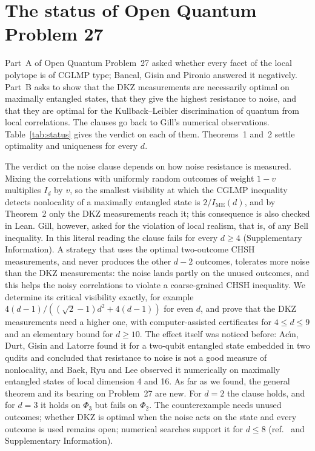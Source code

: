 \documentclass[11pt]{article}
\newcommand{\IME}{I_{\mathrm{ME}}}
\begin{document}
\section*{The status of Open Quantum Problem 27}

Part~A of Open Quantum Problem~27 asked whether every facet of the local polytope is of CGLMP type; Bancal, Gisin and
Pironio answered it negatively\cite{BGP2010}. Part~B asks to show that the DKZ measurements are necessarily optimal on
maximally entangled states, that they give the highest resistance to noise, and that they are optimal for the
Kullback--Leibler discrimination of quantum from local correlations\cite{OQP27}. The clauses go back to Gill's numerical
observations\cite{Gill2007}. Table~\ref{tab:status} gives the verdict on each of them. Theorems~1 and~2 settle
optimality and uniqueness for every $d$.

The verdict on the noise clause depends on how noise resistance is measured. Mixing the correlations with uniformly
random outcomes of weight $1-v$ multiplies $I_d$ by $v$, so the smallest visibility at which the CGLMP inequality
detects nonlocality of a maximally entangled state is $2/\IME(d)$, and by Theorem~2 only the DKZ measurements reach it;
this consequence is also checked in Lean. Gill, however, asked for the violation of local realism, that is, of any Bell
inequality\cite{Gill2007}. In this literal reading the clause fails for every $d\ge4$ (Supplementary Information). A
strategy that uses the optimal two-outcome CHSH measurements, and never produces the other $d-2$ outcomes, tolerates
more noise than the DKZ measurements: the noise lands partly on the unused outcomes, and this helps the noisy
correlations to violate a coarse-grained CHSH inequality. We determine its critical visibility exactly, for
example $4(d-1)/((\sqrt2-1)d^2+4(d-1))$ for even $d$, and prove that the DKZ measurements need a higher one, with
computer-assisted certificates for $4\le d\le9$ and an elementary bound for $d\ge10$. The effect itself was noticed
before: Ac\'{\i}n, Durt, Gisin and Latorre found it for a two-qubit entangled state embedded in two qudits and concluded
that resistance to noise is not a good measure of nonlocality\cite{ADGL2002}, and Baek, Ryu and Lee observed it
numerically on maximally entangled states of local dimension 4 and 16\cite{BaekRyuLee2025}. As far as we found, the
general theorem and its bearing on Problem~27 are new. For $d=2$ the clause holds, and for $d=3$ it holds on $\Phi_3$
but fails on $\Phi_2$. The counterexample needs unused outcomes; whether DKZ is optimal when the noise acts on the state
and every outcome is used remains open; numerical searches support it for $d\le8$ (ref.~ and
Supplementary Information).
\end{document}
